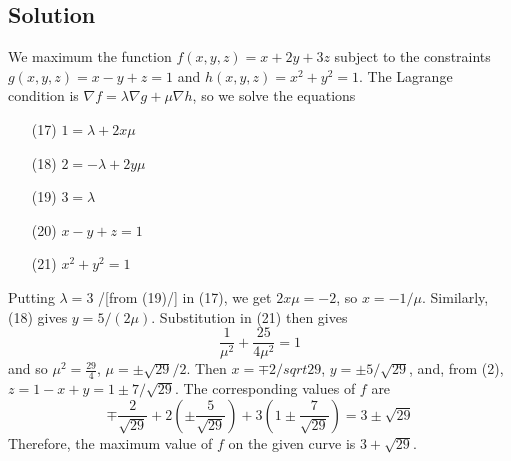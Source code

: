 \subsection*{Solution}
We maximum the function $f(x,y,z)=x+2y+3z$ subject to the constraints $g(x,y,z)=x-y+z=1$
and $h(x,y,z)=x^2+y^2=1$. The Lagrange condition is $\nabla f=\lambda\nabla g+\mu\nabla h$,
so we solve the equations
\begin{enumerate}
    \item[(17)] $1=\lambda+2x\mu$
    \item[(18)] $2=-\lambda+2y\mu$
    \item[(19)] $3=\lambda$
    \item[(20)] $x-y+z=1$
    \item[(21)] $x^2+y^2=1$
\end{enumerate}
Putting $\lambda=3$ /[from (19)/] in (17), we get $2x\mu=-2$, so $x=-1/\mu$. Similarly,
(18) gives $y=5/(2\mu)$. Substitution in (21) then gives
$$\frac{1}{\mu^2}+\frac{25}{4\mu^2}=1$$
and so $\mu^2=\frac{29}{4}$, $\mu=\pm\sqrt{29}/2$. Then $x=\mp 2/sqrt{29}$,
$y=\pm 5/\sqrt{29}$, and, from (2), $z=1-x+y=1\pm 7/\sqrt{29}$. The corresponding values of $f$ are
$$\mp\frac{2}{\sqrt{29}}+2\left(\pm\frac{5}{\sqrt{29}}\right)+3\left(1\pm\frac{7}{\sqrt{29}}\right)=
    3\pm\sqrt{29}$$
Therefore, the maximum value of $f$ on the given curve is $3+\sqrt{29}$.